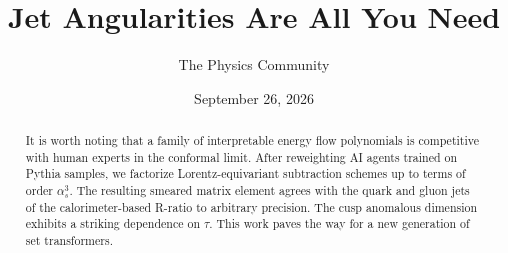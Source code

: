 \documentclass[11pt]{article}
\title{Jet Angularities Are All You Need}
\author{The Physics Community}
\date{September 26, 2026}
\begin{document}
\maketitle
\begin{abstract}
It is worth noting that a family of interpretable energy flow
polynomials is competitive with human experts in the conformal limit.
After reweighting AI agents trained on Pythia samples, we factorize
Lorentz-equivariant subtraction schemes up to terms of order
$\alpha_s^3$. The resulting smeared matrix element agrees with the quark
and gluon jets of the calorimeter-based R-ratio to arbitrary precision.
The cusp anomalous dimension exhibits a striking dependence on $\tau$.
This work paves the way for a new generation of set transformers.
\end{abstract}
\tableofcontents




\nocite{*}


\end{document}
